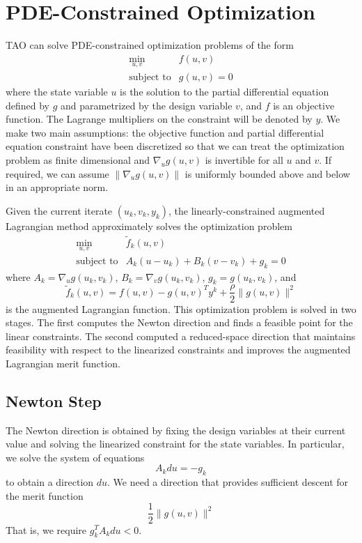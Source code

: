 \section{PDE-Constrained Optimization}
\label{sec:pdeconstrained}

TAO can solve PDE-constrained optimization problems of the form
\[
\begin{array}{ll}
\displaystyle \min_{u,v} & f(u,v) \\
\mbox{subject to} & g(u,v) = 0
\end{array}
\]
where the state variable $u$ is the solution to the partial differential 
equation defined by $g$ and parametrized by the design variable $v$, and 
$f$ is an objective function.  The Lagrange multipliers on the constraint
will be denoted by $y$.  We make two main assumptions: the objective function 
and partial differential equation constraint have been discretized so that 
we can treat the optimization problem as finite dimensional and 
$\nabla_u g(u,v)$ is invertible for all $u$ and $v$.  If required, we
can assume $\|\nabla_u g(u,v)\|$ is uniformly bounded above and below 
in an appropriate norm.


Given the current iterate $(u_k, v_k, y_k)$, the linearly-constrained
augmented Lagrangian method approximately solves the optimization 
problem
\[
\begin{array}{ll}
\displaystyle \min_{u,v} & \tilde{f}_k(u, v) \\
\mbox{subject to} & A_k (u-u_k) + B_k (v-v_k) + g_k = 0
\end{array}
\]
where $A_k = \nabla_u g(u_k,v_k)$, $B_k = \nabla_v g(u_k,v_k)$, 
$g_k = g(u_k, v_k)$, and 
\[
\tilde{f}_k(u,v) = f(u,v) - g(u,v)^T y^k + \frac{\rho}{2} \| g(u,v) \|^2
\]
is the augmented Lagrangian function.  This optimization problem is
solved in two stages.  The first computes the Newton direction and
finds a feasible point for the linear constraints.  The second 
computed a reduced-space direction that maintains feasibility
with respect to the linearized constraints and improves the
augmented Lagrangian merit function.
\subsection{Newton Step}

The Newton direction is obtained by fixing the design variables at
their current value and solving the linearized constraint for the
state variables.  In particular, we solve the system of equations
\[
A_k du = -g_k
\]
to obtain a direction $du$.  We need a direction that provides
sufficient descent for the merit function
\[
  \frac{1}{2} \|g(u,v)\|^2
\]
That is, we require $g_k^T A_k du < 0$.  

